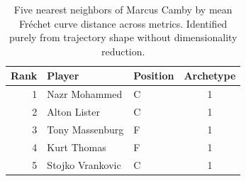 \begin{table}[htbp]
  \centering\small
  \begin{tabular}{rllc}
    \toprule
    Rank & Player & Position & Archetype \\
    \midrule
    1 & Nazr Mohammed & C & 1 \\
    2 & Alton Lister & C & 1 \\
    3 & Tony Massenburg & F & 1 \\
    4 & Kurt Thomas & F & 1 \\
    5 & Stojko Vrankovic & C & 1 \\
    \bottomrule
  \end{tabular}
  \caption{Five nearest neighbors of Marcus Camby by mean Fr\'{e}chet curve distance across metrics. Identified purely from trajectory shape without dimensionality reduction.}
  \label{tab:Marcus_Camby_frechet_curve_neighbors}
\end{table}

